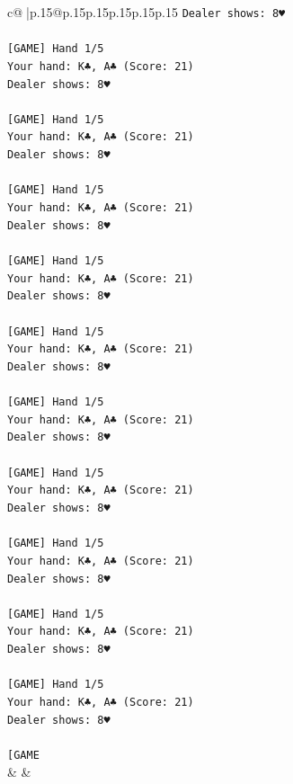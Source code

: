\documentclass{article}
\begin{document}
{\begin{supertabular}{c@{$\;$}|p{.15\linewidth}@{}p{.15\linewidth}p{.15\linewidth}p{.15\linewidth}p{.15\linewidth}p{.15\linewidth}}
{{{\texttt{Dealer shows: 8♥} \\
\\ 
\texttt{{[}GAME{]} Hand 1/5} \\
\texttt{Your hand: K♣, A♣ (Score: 21)} \\
\texttt{Dealer shows: 8♥} \\
\\ 
\texttt{{[}GAME{]} Hand 1/5} \\
\texttt{Your hand: K♣, A♣ (Score: 21)} \\
\texttt{Dealer shows: 8♥} \\
\\ 
\texttt{{[}GAME{]} Hand 1/5} \\
\texttt{Your hand: K♣, A♣ (Score: 21)} \\
\texttt{Dealer shows: 8♥} \\
\\ 
\texttt{{[}GAME{]} Hand 1/5} \\
\texttt{Your hand: K♣, A♣ (Score: 21)} \\
\texttt{Dealer shows: 8♥} \\
\\ 
\texttt{{[}GAME{]} Hand 1/5} \\
\texttt{Your hand: K♣, A♣ (Score: 21)} \\
\texttt{Dealer shows: 8♥} \\
\\ 
\texttt{{[}GAME{]} Hand 1/5} \\
\texttt{Your hand: K♣, A♣ (Score: 21)} \\
\texttt{Dealer shows: 8♥} \\
\\ 
\texttt{{[}GAME{]} Hand 1/5} \\
\texttt{Your hand: K♣, A♣ (Score: 21)} \\
\texttt{Dealer shows: 8♥} \\
\\ 
\texttt{{[}GAME{]} Hand 1/5} \\
\texttt{Your hand: K♣, A♣ (Score: 21)} \\
\texttt{Dealer shows: 8♥} \\
\\ 
\texttt{{[}GAME{]} Hand 1/5} \\
\texttt{Your hand: K♣, A♣ (Score: 21)} \\
\texttt{Dealer shows: 8♥} \\
\\ 
\texttt{{[}GAME{]} Hand 1/5} \\
\texttt{Your hand: K♣, A♣ (Score: 21)} \\
\texttt{Dealer shows: 8♥} \\
\\ 
\texttt{{[}GAME} \\
            }
        }
    }
    & & \\ \\


\end{supertabular}}
\end{document}
